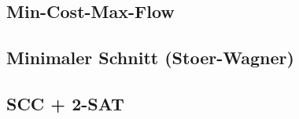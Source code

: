 \subsection{Min-Cost-Max-Flow}


\subsection{Minimaler Schnitt (Stoer-Wagner)}


%


%

\subsection{SCC + 2-SAT}

